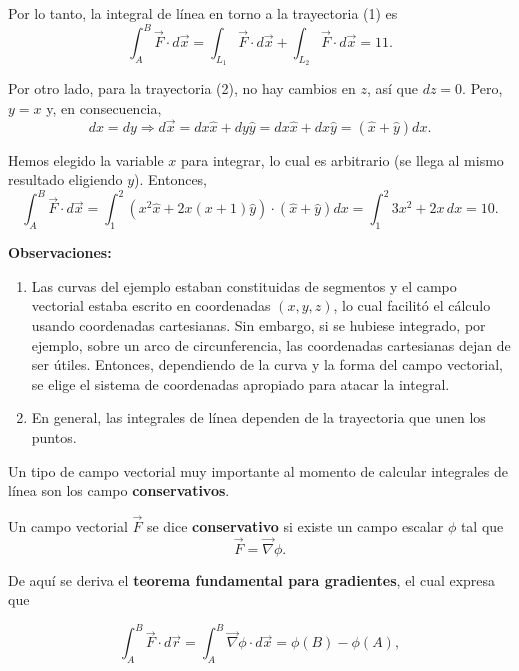 \begin{ejemplo}
    Por lo tanto, la integral de línea en torno a la trayectoria (1) es
    $$\int_A^B \Vec{F} \cdot d\Vec{x} = \int_{L_1} \Vec{F} \cdot d \Vec{x} + \int_{L_2} \Vec{F} \cdot d \Vec{x} = 11.$$

    Por otro lado, para la trayectoria (2), no hay cambios en $z$, así que $dz = 0$. Pero, $y = x$ y, en consecuencia,
    $$dx = dy \Rightarrow d\Vec{x} = dx \hat{x} + dy \hat{y} = dx \hat{x} + dx \hat{y} = (\hat{x} + \hat{y} ) dx.$$

    Hemos elegido la variable $x$ para integrar, lo cual es arbitrario (se llega al mismo resultado eligiendo $y$). Entonces,
    $$\int_A^B \Vec{F} \cdot d\Vec{x} = \int_1^2 (x^2 \hat{x} + 2x(x+1) \hat{y}) \cdot (\hat{x} + \hat{y} ) dx = \int_1^2 3x^2 + 2x \,dx = 10.$$
\end{ejemplo}

\textbf{Observaciones:}

\begin{enumerate}
    \item Las curvas del ejemplo estaban constituidas de segmentos y el campo vectorial estaba escrito en coordenadas $(x,y,z)$, lo cual facilitó el cálculo usando coordenadas cartesianas. Sin embargo, si se hubiese integrado, por ejemplo, sobre un arco de circunferencia, las coordenadas cartesianas dejan de ser útiles. Entonces, dependiendo de la curva y la forma del campo vectorial, se elige el sistema de coordenadas apropiado para atacar la integral.

    \item En general, las integrales de línea dependen de la trayectoria que unen los puntos.
\end{enumerate}


Un tipo de campo vectorial muy importante al momento de calcular integrales de línea son los campo \textbf{conservativos}. 

Un campo vectorial $\vec{F}$ se dice \textbf{conservativo} si existe un campo escalar $\phi$ tal que
\begin{equation*}
\vec{F} = \vec{\nabla} \phi.
\end{equation*}

De aquí se deriva el \textbf{teorema fundamental para gradientes}, el cual expresa que
\begin{shaded}
   \begin{equation*}
\int_A^B \vec{F} \cdot d\vec{r} = \int_A^B \Vec{\nabla} \phi \cdot d\Vec{x} = \phi(B) - \phi(A),
\end{equation*} 
\end{shaded}

